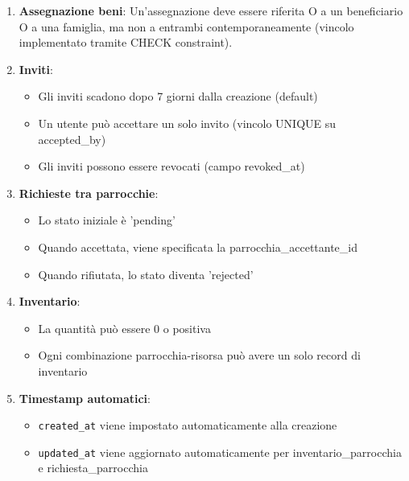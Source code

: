 \documentclass[11pt,a4paper]{article}
\begin{document}
\begin{enumerate}
\item \textbf{Assegnazione beni}: Un'assegnazione deve essere riferita O a un beneficiario O a una famiglia, ma non a entrambi contemporaneamente (vincolo implementato tramite CHECK constraint).

\item \textbf{Inviti}: 
   \begin{itemize}
   \item Gli inviti scadono dopo 7 giorni dalla creazione (default)
   \item Un utente può accettare un solo invito (vincolo UNIQUE su accepted\_by)
   \item Gli inviti possono essere revocati (campo revoked\_at)
   \end{itemize}

\item \textbf{Richieste tra parrocchie}:
   \begin{itemize}
   \item Lo stato iniziale è 'pending'
   \item Quando accettata, viene specificata la parrocchia\_accettante\_id
   \item Quando rifiutata, lo stato diventa 'rejected'
   \end{itemize}

\item \textbf{Inventario}: 
   \begin{itemize}
   \item La quantità può essere 0 o positiva
   \item Ogni combinazione parrocchia-risorsa può avere un solo record di inventario
   \end{itemize}

\item \textbf{Timestamp automatici}:
   \begin{itemize}
   \item \texttt{created\_at} viene impostato automaticamente alla creazione
   \item \texttt{updated\_at} viene aggiornato automaticamente per inventario\_parrocchia e richiesta\_parrocchia
   \end{itemize}
\end{enumerate}
\end{document}
